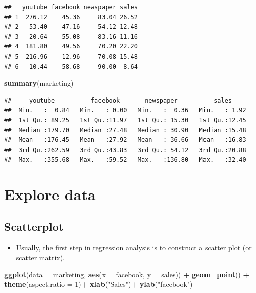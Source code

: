 \documentclass[]{book}
\newenvironment{Shaded}{\begin{snugshade}}{\end{snugshade}}
\newcommand{\DataTypeTok}[1]{\textcolor[rgb]{0.13,0.29,0.53}{#1}}
\newcommand{\DecValTok}[1]{\textcolor[rgb]{0.00,0.00,0.81}{#1}}
\newcommand{\KeywordTok}[1]{\textcolor[rgb]{0.13,0.29,0.53}{\textbf{#1}}}
\newcommand{\NormalTok}[1]{#1}
\newcommand{\OperatorTok}[1]{\textcolor[rgb]{0.81,0.36,0.00}{\textbf{#1}}}
\newcommand{\StringTok}[1]{\textcolor[rgb]{0.31,0.60,0.02}{#1}}
\providecommand{\tightlist}{%
  \setlength{\itemsep}{0pt}\setlength{\parskip}{0pt}}
\begin{document}
\begin{verbatim}
##   youtube facebook newspaper sales
## 1  276.12    45.36     83.04 26.52
## 2   53.40    47.16     54.12 12.48
## 3   20.64    55.08     83.16 11.16
## 4  181.80    49.56     70.20 22.20
## 5  216.96    12.96     70.08 15.48
## 6   10.44    58.68     90.00  8.64
\end{verbatim}

\begin{Shaded}
\begin{Highlighting}[]
\KeywordTok{summary}\NormalTok{(marketing)}
\end{Highlighting}
\end{Shaded}

\begin{verbatim}
##     youtube          facebook       newspaper          sales      
##  Min.   :  0.84   Min.   : 0.00   Min.   :  0.36   Min.   : 1.92  
##  1st Qu.: 89.25   1st Qu.:11.97   1st Qu.: 15.30   1st Qu.:12.45  
##  Median :179.70   Median :27.48   Median : 30.90   Median :15.48  
##  Mean   :176.45   Mean   :27.92   Mean   : 36.66   Mean   :16.83  
##  3rd Qu.:262.59   3rd Qu.:43.83   3rd Qu.: 54.12   3rd Qu.:20.88  
##  Max.   :355.68   Max.   :59.52   Max.   :136.80   Max.   :32.40
\end{verbatim}

\hypertarget{explore-data}{%
\section{Explore data}\label{explore-data}}

\hypertarget{scatterplot}{%
\subsection{Scatterplot}\label{scatterplot}}

\begin{itemize}
\tightlist
\item
  Usually, the first step in regression analysis is to construct a scatter plot (or scatter matrix).
\end{itemize}

\begin{Shaded}
\begin{Highlighting}[]
\KeywordTok{ggplot}\NormalTok{(}\DataTypeTok{data =}\NormalTok{ marketing, }\KeywordTok{aes}\NormalTok{(}\DataTypeTok{x =}\NormalTok{ facebook, }\DataTypeTok{y =}\NormalTok{ sales)) }\OperatorTok{+}
\StringTok{  }\KeywordTok{geom_point}\NormalTok{() }\OperatorTok{+}
\StringTok{  }\KeywordTok{theme}\NormalTok{(}\DataTypeTok{aspect.ratio =} \DecValTok{1}\NormalTok{)}\OperatorTok{+}
\StringTok{  }\KeywordTok{xlab}\NormalTok{(}\StringTok{"Sales"}\NormalTok{)}\OperatorTok{+}
\StringTok{  }\KeywordTok{ylab}\NormalTok{(}\StringTok{"facebook"}\NormalTok{)}
\end{Highlighting}
\end{Shaded}
\end{document}
